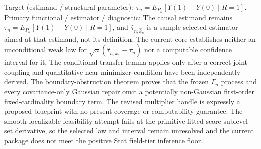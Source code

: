 \documentclass{article}
\begin{document}
Target (estimand / structural parameter): \(\tau_n=E_{P_n}[Y(1)-Y(0)\mid R=1]\).
Primary functional / estimator / diagnostic: The causal estimand remains \(\tau_n=E_{P_n}[Y(1)-Y(0)\mid R=1]\), and \(\widehat\tau_{n,\widehat k_n}\) is a sample-selected estimator aimed at that estimand, not its definition.  The current core establishes neither an unconditional weak law for \(\sqrt n(\widehat\tau_{n,\widehat k_n}-\tau_n)\) nor a computable confidence interval for it.  The conditional transfer lemma applies only after a correct joint coupling and quantitative near-minimizer condition have been independently derived.  The boundary-obstruction theorem proves that the frozen \(\Gamma_n\) process and every covariance-only Gaussian repair omit a potentially non-Gaussian first-order fixed-cardinality boundary term.  The revised multiplier handle is expressly a proposed blueprint with no present coverage or computability guarantee.  The smooth-localizable feasibility attempt fails at the primitive fitted-score sublevel-set derivative, so the selected law and interval remain unresolved and the current package does not meet the positive Stat field-tier inference floor..
\end{document}
